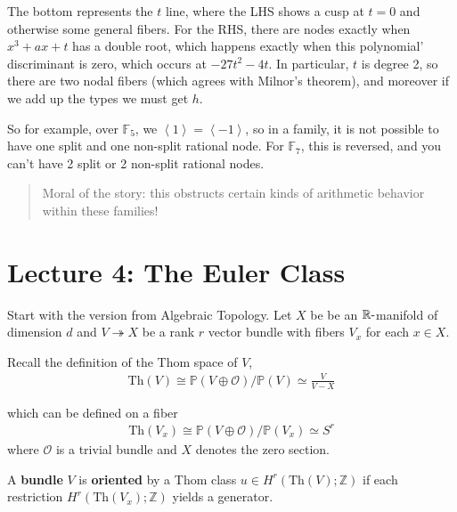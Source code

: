 The bottom represents the \(t\) line, where the LHS shows a cusp at
\(t=0\) and otherwise some general fibers. For the RHS, there are nodes
exactly when \(x^3+ax+t\) has a double root, which happens exactly when
this polynomial' discriminant is zero, which occurs at \(-27t^2-4t\). In
particular, \(t\) is degree 2, so there are two nodal fibers (which
agrees with Milnor's theorem), and moreover if we add up the types we
must get \(h\).

So for example, over \({\mathbb{F}}_5\), we
\(\left\langle{1}\right\rangle = \left\langle{-1}\right\rangle\), so in
a family, it is not possible to have one split and one non-split
rational node. For \({\mathbb{F}}_7\), this is reversed, and you can't
have 2 split or 2 non-split rational nodes.

\begin{quote}
Moral of the story: this obstructs certain kinds of arithmetic behavior
within these families!
\end{quote}

\hypertarget{lecture-4-the-euler-class}{%
\section{Lecture 4: The Euler Class}\label{lecture-4-the-euler-class}}

Start with the version from Algebraic Topology. Let \(X\) be be an
\({\mathbb{R}}{\hbox{-}}\)manifold of dimension \(d\) and
\(V\twoheadrightarrow X\) be a rank \(r\) vector bundle with fibers
\(V_x\) for each \(x\in X\).

\begin{definition}

Recall the definition of the Thom space of \(V\),
\begin{align*}
\text{Th}(V) \cong {\mathbb{P}}(V\oplus \mathcal O)  / {\mathbb{P}}(V) \simeq\frac{V}{V-X}
\end{align*}

which can be defined on a fiber
\begin{align*}
\text{Th}(V_x) \cong {\mathbb{P}}(V\oplus \mathcal O)  / {\mathbb{P}}(V_x) \simeq S^r
\end{align*}
where \(\mathcal O\) is a trivial bundle and \(X\) denotes the zero
section.

\end{definition}

\begin{definition}

A \textbf{bundle} \(V\) is \textbf{oriented} by a Thom class
\(u\in H^r(\text{Th}(V); {\mathbb{Z}})\) if each restriction
\(H^r(\text{Th}(V_x); {\mathbb{Z}})\) yields a generator.

\end{definition}

